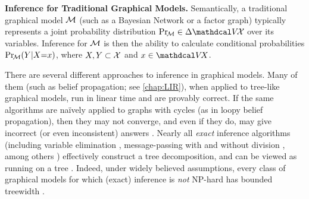 \textbf{Inference for Traditional Graphical Models.}
Semantically, a traditional graphical model $\cal M$ (such as a Bayesian Network or a factor graph) typically represents a joint probability distribution $\Pr_{\!\cal M}
 \in \Delta \V\!\X$ over its variables.
Inference for $\cal M$ is then the ability to calculate conditional probabilities
 $\Pr_{\!\cal M}(Y|X{=}x)$,
where $X,Y \subset \mathcal X$ and $x \in \V\! X$. 

There are several different approaches to inference in graphical models.
%
Many of them (such as belief propagation; see \cref{chap:LIR}),
when applied to tree-like graphical models,
run in linear time and are provably correct.
If the same algorithms are na{\"i}vely applied to graphs with cycles (as in loopy belief propagation),
then they may not converge, and even if they do,
may give incorrect (or even inconsistent) answers
\parencite{wainwright2008graphical}.
Nearly all \emph{exact} inference algorithms
(including variable elimination  \parencite{bertele1972nonserial},
 message-passing with \parencite{lauritzen1988local}
    and without division \parencite{shafer1990probability},
    among others \parencite{wainwright2003tree})
effectively construct a tree decomposition, and can be
viewed as running on a tree \parencite[\S9-11]{koller2009probabilistic}.
Indeed,
under widely believed assumptions,
every class of graphical models
for which (exact) inference is \emph{not} NP-hard
has bounded treewidth
\parencite{chandrasekaran2012complexity}.

